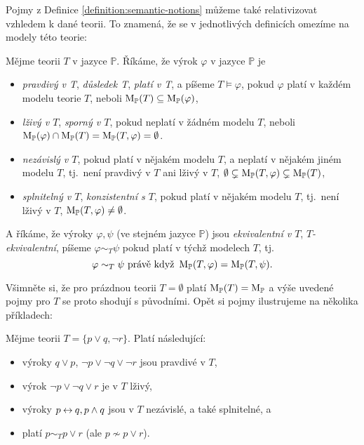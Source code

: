 Pojmy z Definice \ref{definition:semantic-notions} můžeme také relativizovat vzhledem k dané teorii. To znamená, že se v jednotlivých definicích omezíme na modely této teorie:

\begin{definition}
    Mějme teorii $T$ v jazyce $\mathbb P$. Říkáme, že výrok $\varphi$ v jazyce $\mathbb P$ je
    \begin{itemize}
        \item \emph{pravdivý v T}, \emph{důsledek T}, \emph{platí v T}, a píšeme $T \models \varphi$, pokud $\varphi$ platí v každém modelu teorie $T$, neboli $\operatorname{M}_\mathbb P(T)\subseteq \operatorname{M}_\mathbb P(\varphi)$,
        \item \emph{lživý v $T$}, \emph{sporný v $T$}, pokud neplatí v žádném modelu $T$, neboli $\operatorname{M}_\mathbb P(\varphi)\cap\operatorname{M}_\mathbb P(T)=\operatorname{M}_\mathbb P(T,\varphi)=\emptyset$.
        \item \emph{nezávislý v $T$}, pokud platí v nějakém modelu $T$, a neplatí v nějakém jiném modelu $T$, tj.\ není pravdivý v $T$ ani lživý v $T$, $\emptyset\subsetneq\operatorname{M}_\mathbb P(T,\varphi)\subsetneq\operatorname{M}_\mathbb P(T)$,
        \item \emph{splnitelný v $T$}, \emph{konzistentní s $T$}, pokud platí v nějakém modelu $T$, tj.\ není lživý v $T$, $\operatorname{M}_\mathbb P(T,\varphi)\neq\emptyset$.
    \end{itemize}
    A říkáme, že výroky $\varphi,\psi$ (ve stejném jazyce $\mathbb P$) jsou \emph{ekvivalentní v $T$}, \emph{$T$-ekvivalentní}, píšeme $\varphi\sim_T\psi$ pokud platí v týchž modelech $T$, tj.\
    $$
    \varphi\sim_T\psi\text{ právě když }\operatorname{M}_\mathbb P(T,\varphi)=\operatorname{M}_\mathbb P(T,\psi).
    $$
    \end{definition}

Všimněte si, že pro prázdnou teorii $T=\emptyset$ platí $\operatorname{M}_\mathbb P(T)=\operatorname{M}_\mathbb P$ a výše uvedené pojmy pro $T$ se proto shodují s původními. Opět si pojmy ilustrujeme na několika příkladech:

\begin{example} Mějme teorii $T=\{p\lor q,\neg r\}$. Platí následující:
    \begin{itemize}
        \item výroky $q\lor p$, $\neg p\lor\neg q\lor \neg r$ jsou pravdivé v $T$,
        \item výrok $\neg p\lor\neg q\lor r$ je v $T$ lživý,
        \item výroky $p\mathbin{\leftrightarrow} q, p\land q$ jsou v $T$ nezávislé, a také splnitelné, a
        \item platí $p\sim_T p\lor r$ (ale $p\not\sim p\lor r$).
    \end{itemize}      
\end{example}



